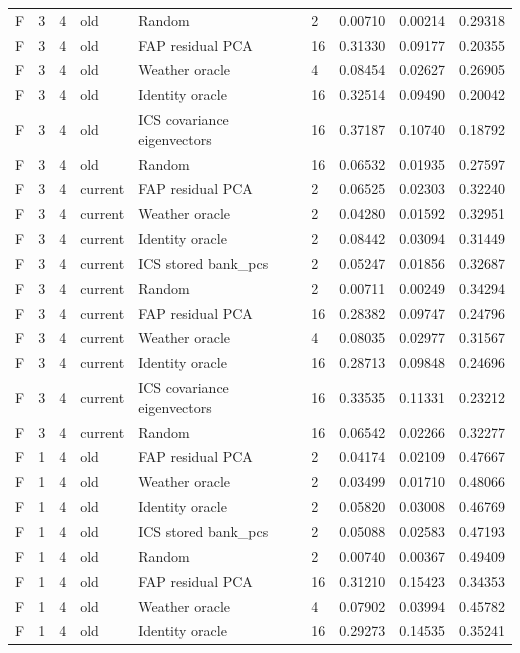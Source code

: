 \begin{tabular}{lllllllll}
F & 3 & 4 & old & Random & 2 & 0.00710 & 0.00214 & 0.29318 \\
F & 3 & 4 & old & FAP residual PCA & 16 & 0.31330 & 0.09177 & 0.20355 \\
F & 3 & 4 & old & Weather oracle & 4 & 0.08454 & 0.02627 & 0.26905 \\
F & 3 & 4 & old & Identity oracle & 16 & 0.32514 & 0.09490 & 0.20042 \\
F & 3 & 4 & old & ICS covariance eigenvectors & 16 & 0.37187 & 0.10740 & 0.18792 \\
F & 3 & 4 & old & Random & 16 & 0.06532 & 0.01935 & 0.27597 \\
F & 3 & 4 & current & FAP residual PCA & 2 & 0.06525 & 0.02303 & 0.32240 \\
F & 3 & 4 & current & Weather oracle & 2 & 0.04280 & 0.01592 & 0.32951 \\
F & 3 & 4 & current & Identity oracle & 2 & 0.08442 & 0.03094 & 0.31449 \\
F & 3 & 4 & current & ICS stored bank\_pcs & 2 & 0.05247 & 0.01856 & 0.32687 \\
F & 3 & 4 & current & Random & 2 & 0.00711 & 0.00249 & 0.34294 \\
F & 3 & 4 & current & FAP residual PCA & 16 & 0.28382 & 0.09747 & 0.24796 \\
F & 3 & 4 & current & Weather oracle & 4 & 0.08035 & 0.02977 & 0.31567 \\
F & 3 & 4 & current & Identity oracle & 16 & 0.28713 & 0.09848 & 0.24696 \\
F & 3 & 4 & current & ICS covariance eigenvectors & 16 & 0.33535 & 0.11331 & 0.23212 \\
F & 3 & 4 & current & Random & 16 & 0.06542 & 0.02266 & 0.32277 \\
F & 1 & 4 & old & FAP residual PCA & 2 & 0.04174 & 0.02109 & 0.47667 \\
F & 1 & 4 & old & Weather oracle & 2 & 0.03499 & 0.01710 & 0.48066 \\
F & 1 & 4 & old & Identity oracle & 2 & 0.05820 & 0.03008 & 0.46769 \\
F & 1 & 4 & old & ICS stored bank\_pcs & 2 & 0.05088 & 0.02583 & 0.47193 \\
F & 1 & 4 & old & Random & 2 & 0.00740 & 0.00367 & 0.49409 \\
F & 1 & 4 & old & FAP residual PCA & 16 & 0.31210 & 0.15423 & 0.34353 \\
F & 1 & 4 & old & Weather oracle & 4 & 0.07902 & 0.03994 & 0.45782 \\
F & 1 & 4 & old & Identity oracle & 16 & 0.29273 & 0.14535 & 0.35241 \\

\end{tabular}

